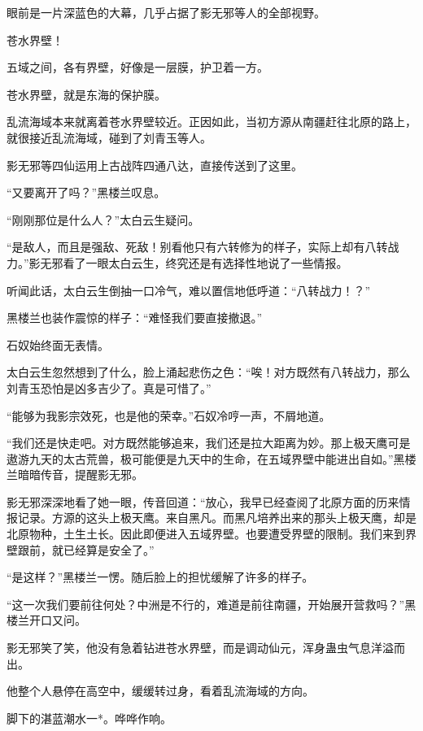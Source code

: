 
\begin{this_body}

眼前是一片深蓝色的大幕，几乎占据了影无邪等人的全部视野。

苍水界壁！

五域之间，各有界壁，好像是一层膜，护卫着一方。

苍水界壁，就是东海的保护膜。

乱流海域本来就离着苍水界壁较近。正因如此，当初方源从南疆赶往北原的路上，就很接近乱流海域，碰到了刘青玉等人。

影无邪等四仙运用上古战阵四通八达，直接传送到了这里。

“又要离开了吗？”黑楼兰叹息。

“刚刚那位是什么人？”太白云生疑问。

“是敌人，而且是强敌、死敌！别看他只有六转修为的样子，实际上却有八转战力。”影无邪看了一眼太白云生，终究还是有选择性地说了一些情报。

听闻此话，太白云生倒抽一口冷气，难以置信地低呼道：“八转战力！？”

黑楼兰也装作震惊的样子：“难怪我们要直接撤退。”

石奴始终面无表情。

太白云生忽然想到了什么，脸上涌起悲伤之色：“唉！对方既然有八转战力，那么刘青玉恐怕是凶多吉少了。真是可惜了。”

“能够为我影宗效死，也是他的荣幸。”石奴冷哼一声，不屑地道。

“我们还是快走吧。对方既然能够追来，我们还是拉大距离为妙。那上极天鹰可是遨游九天的太古荒兽，极可能便是九天中的生命，在五域界壁中能进出自如。”黑楼兰暗暗传音，提醒影无邪。

影无邪深深地看了她一眼，传音回道：“放心，我早已经查阅了北原方面的历来情报记录。方源的这头上极天鹰。来自黑凡。而黑凡培养出来的那头上极天鹰，却是北原物种，土生土长。因此即便进入五域界壁。也要遭受界壁的限制。我们来到界壁跟前，就已经算是安全了。”

“是这样？”黑楼兰一愣。随后脸上的担忧缓解了许多的样子。

“这一次我们要前往何处？中洲是不行的，难道是前往南疆，开始展开营救吗？”黑楼兰开口又问。

影无邪笑了笑，他没有急着钻进苍水界壁，而是调动仙元，浑身蛊虫气息洋溢而出。

他整个人悬停在高空中，缓缓转过身，看着乱流海域的方向。

脚下的湛蓝潮水一*。哗哗作响。


\end{this_body}
